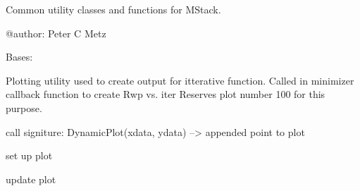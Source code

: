 \documentclass[letterpaper,10pt,english]{sphinxmanual}
\begin{document}
Common utility classes and functions for MStack.

@author: Peter C Metz

\begin{fulllineitems}
\label{\detokenize{rst/utilities:mstack.utilities.DynamicPlot}}
Bases: 

Plotting utility used to create output for itterative function.
Called in minimizer callback function to create Rwp  vs.  iter
Reserves plot number 100 for this purpose.

call signiture: DynamicPlot(xdata, ydata) --\textgreater{} appended point to plot

\begin{fulllineitems}
\label{\detokenize{rst/utilities:mstack.utilities.DynamicPlot.__init__}}
\end{fulllineitems}


\begin{fulllineitems}
\label{\detokenize{rst/utilities:mstack.utilities.DynamicPlot.on_launch}}
set up plot

\end{fulllineitems}


\begin{fulllineitems}
\label{\detokenize{rst/utilities:mstack.utilities.DynamicPlot.on_running}}
update plot

\end{fulllineitems}


\end{fulllineitems}

\end{document}
